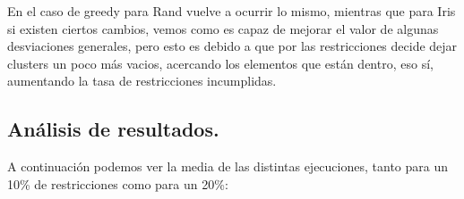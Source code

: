 \documentclass[12pt, spanish]{article}
\begin{document}
En el caso de greedy para Rand vuelve a ocurrir lo mismo, mientras que para Iris si existen ciertos cambios, vemos como es capaz de mejorar el valor de algunas desviaciones generales, pero esto es debido a que por las restricciones decide dejar clusters un poco más vacios, acercando los elementos que están dentro, eso sí, aumentando la tasa de restricciones incumplidas.

\newpage


\subsection{Análisis de resultados.	}

A continuación podemos ver la media de las distintas ejecuciones, tanto para un 10\% de restricciones como para un 20\%:
\end{document}
